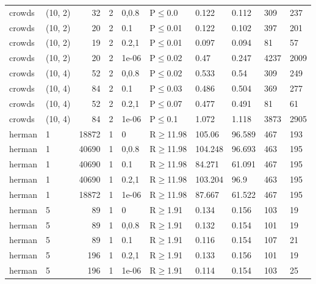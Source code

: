 \begin{longtable}{llrrllllll}
 crowds        & (10, 2)  &     	32 &   2 & 0,0.8 & P$\leq$0.0   & 0.122   & 0.112   & 309     & 237    \\
 crowds        & (10, 2)  &     	20 &   2 & 0.1   & P$\leq$0.01  & 0.122   & 0.102   & 397     & 201    \\
 crowds        & (10, 2)  &     	19 &   2 & 0.2,1 & P$\leq$0.01  & 0.097   & 0.094   & 81      & 57     \\
 crowds        & (10, 2)  &     	20 &   2 & 1e-06 & P$\leq$0.02  & 0.47    & 0.247   & 4237    & 2009   \\
 crowds        & (10, 4)  &     	52 &   2 & 0,0.8 & P$\leq$0.02  & 0.533   & 0.54    & 309     & 249    \\
 crowds        & (10, 4)  &     	84 &   2 & 0.1   & P$\leq$0.03  & 0.486   & 0.504   & 369     & 277    \\
 crowds        & (10, 4)  &     	52 &   2 & 0.2,1 & P$\leq$0.07  & 0.477   & 0.491   & 81      & 61     \\
 crowds        & (10, 4)  &     	84 &   2 & 1e-06 & P$\leq$0.1   & 1.072   & 1.118   & 3873    & 2905   \\
 herman        & 1        &  	18872 &   1 & 0     & R$\geq$11.98 & 105.06  & 96.589  & 467     & 193    \\
 herman        & 1        &  	40690 &   1 & 0,0.8 & R$\geq$11.98 & 104.248 & 96.693  & 463     & 195    \\
 herman        & 1        &  	40690 &   1 & 0.1   & R$\geq$11.98 & 84.271  & 61.091  & 467     & 195    \\
 herman        & 1        &  	40690 &   1 & 0.2,1 & R$\geq$11.98 & 103.204 & 96.9    & 463     & 195    \\
 herman        & 1        &  	18872 &   1 & 1e-06 & R$\geq$11.98 & 87.667  & 61.522  & 467     & 195    \\
 herman        & 5        &     	89 &   1 & 0     & R$\geq$1.91  & 0.134   & 0.156   & 103     & 19     \\
 herman        & 5        &     	89 &   1 & 0,0.8 & R$\geq$1.91  & 0.132   & 0.154   & 101     & 19     \\
 herman        & 5        &     	89 &   1 & 0.1   & R$\geq$1.91  & 0.116   & 0.154   & 107     & 21     \\
 herman        & 5        &    	196 &   1 & 0.2,1 & R$\geq$1.91  & 0.133   & 0.156   & 101     & 19     \\
 herman        & 5        &    	196 &   1 & 1e-06 & R$\geq$1.91  & 0.114   & 0.154   & 103     & 25     \\

\end{longtable}
